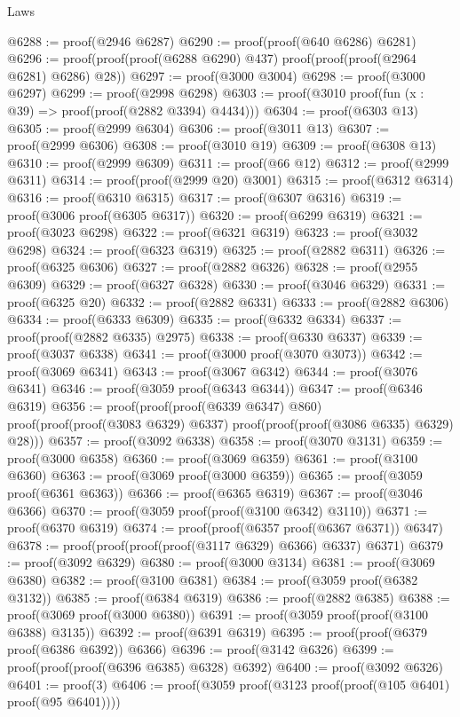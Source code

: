 \begin{lexlean}{Laws}
\begin{coremodule}
@6288 := proof(@2946 @6287)
@6290 := proof(proof(@640 @6286) @6281)
@6296 := proof(proof(proof(@6288 @6290) @437) proof(proof(proof(@2964 @6281) @6286) @28))
@6297 := proof(@3000 @3004)
@6298 := proof(@3000 @6297)
@6299 := proof(@2998 @6298)
@6303 := proof(@3010 proof(fun (x : @39) => proof(proof(@2882 @3394) @4434)))
@6304 := proof(@6303 @13)
@6305 := proof(@2999 @6304)
@6306 := proof(@3011 @13)
@6307 := proof(@2999 @6306)
@6308 := proof(@3010 @19)
@6309 := proof(@6308 @13)
@6310 := proof(@2999 @6309)
@6311 := proof(@66 @12)
@6312 := proof(@2999 @6311)
@6314 := proof(proof(@2999 @20) @3001)
@6315 := proof(@6312 @6314)
@6316 := proof(@6310 @6315)
@6317 := proof(@6307 @6316)
@6319 := proof(@3006 proof(@6305 @6317))
@6320 := proof(@6299 @6319)
@6321 := proof(@3023 @6298)
@6322 := proof(@6321 @6319)
@6323 := proof(@3032 @6298)
@6324 := proof(@6323 @6319)
@6325 := proof(@2882 @6311)
@6326 := proof(@6325 @6306)
@6327 := proof(@2882 @6326)
@6328 := proof(@2955 @6309)
@6329 := proof(@6327 @6328)
@6330 := proof(@3046 @6329)
@6331 := proof(@6325 @20)
@6332 := proof(@2882 @6331)
@6333 := proof(@2882 @6306)
@6334 := proof(@6333 @6309)
@6335 := proof(@6332 @6334)
@6337 := proof(proof(@2882 @6335) @2975)
@6338 := proof(@6330 @6337)
@6339 := proof(@3037 @6338)
@6341 := proof(@3000 proof(@3070 @3073))
@6342 := proof(@3069 @6341)
@6343 := proof(@3067 @6342)
@6344 := proof(@3076 @6341)
@6346 := proof(@3059 proof(@6343 @6344))
@6347 := proof(@6346 @6319)
@6356 := proof(proof(proof(@6339 @6347) @860)
      proof(proof(proof(@3083 @6329) @6337) proof(proof(proof(@3086 @6335) @6329) @28)))
@6357 := proof(@3092 @6338)
@6358 := proof(@3070 @3131)
@6359 := proof(@3000 @6358)
@6360 := proof(@3069 @6359)
@6361 := proof(@3100 @6360)
@6363 := proof(@3069 proof(@3000 @6359))
@6365 := proof(@3059 proof(@6361 @6363))
@6366 := proof(@6365 @6319)
@6367 := proof(@3046 @6366)
@6370 := proof(@3059 proof(proof(@3100 @6342) @3110))
@6371 := proof(@6370 @6319)
@6374 := proof(proof(@6357 proof(@6367 @6371)) @6347)
@6378 := proof(proof(proof(proof(@3117 @6329) @6366) @6337) @6371)
@6379 := proof(@3092 @6329)
@6380 := proof(@3000 @3134)
@6381 := proof(@3069 @6380)
@6382 := proof(@3100 @6381)
@6384 := proof(@3059 proof(@6382 @3132))
@6385 := proof(@6384 @6319)
@6386 := proof(@2882 @6385)
@6388 := proof(@3069 proof(@3000 @6380))
@6391 := proof(@3059 proof(proof(@3100 @6388) @3135))
@6392 := proof(@6391 @6319)
@6395 := proof(proof(@6379 proof(@6386 @6392)) @6366)
@6396 := proof(@3142 @6326)
@6399 := proof(proof(proof(@6396 @6385) @6328) @6392)
@6400 := proof(@3092 @6326)
@6401 := proof(3)
@6406 := proof(@3059 proof(@3123 proof(proof(@105 @6401) proof(@95 @6401))))

\end{coremodule}
\end{lexlean}
